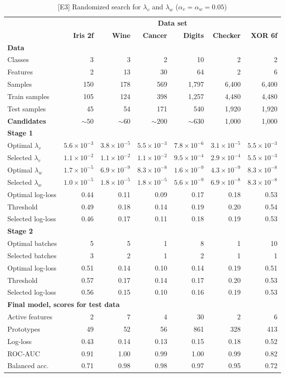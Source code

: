 %
\begin{table}
\caption{[E3] Randomized search for $\lambda_v$ and $\lambda_w$ ($\alpha_v=\alpha_w=0.05$)}
\label{tab_e3}
%
\begin{center}
\small
\begin{tabular}{|lrrrrrr|}
\hline
&\multicolumn{6}{c|}{\textbf{\hrulefill\ Data set \hrulefill}}\\
&\textbf{Iris 2f}&\textbf{Wine}&\textbf{Cancer}&\textbf{Digits}&\textbf{Checker}&\textbf{XOR 6f}\\
\multicolumn{7}{|l|}{\textbf{Data}}\\
Classes&3&3&2&10&2&2\\
Features&2&13&30&64&2&6\\
Samples&150&178&569&1,797&6,400&6,400\\
Train samples&105&124&398&1,257&4,480&4,480\\
Test samples&45&54&171&540&1,920&1,920\\
\textbf{Candidates}&$\sim50$&$\sim60$&$\sim200$&$\sim630$&1,000&1,000\\
\multicolumn{7}{|l|}{\textbf{Stage 1}}\\
Optimal $\lambda_v$&$5.6\times10^{-3}$&$3.8\times10^{-5}$&$5.5\times10^{-3}$&$7.8\times10^{-6}$&$3.1\times10^{-5}$&$5.5\times10^{-3}$\\
Selected $\lambda_v$&$1.1\times10^{-2}$&$1.1\times10^{-2}$&$1.1\times10^{-2}$&$9.5\times10^{-4}$&$2.9\times10^{-4}$&$5.5\times10^{-3}$\\
Optimal $\lambda_w$&$1.7\times10^{-5}$&$6.9\times10^{-9}$&$8.3\times10^{-8}$&$1.6\times10^{-9}$&$4.3\times10^{-9}$&$8.3\times10^{-8}$\\
Selected $\lambda_w$&$1.0\times10^{-5}$&$1.8\times10^{-5}$&$1.8\times10^{-5}$&$5.6\times10^{-9}$&$6.9\times10^{-8}$&$8.3\times10^{-8}$\\
Optimal log-loss&0.44&0.11&0.09&0.17&0.18&0.53\\
Threshold&0.49&0.18&0.14&0.19&0.20&0.54\\
Selected log-loss&0.46&0.17&0.11&0.18&0.19&0.53\\
\multicolumn{7}{|l|}{\textbf{Stage 2}}\\
Optimal batches&5&5&1&8&1&10\\
Selected batches&3&2&1&2&1&1\\
Optimal log-loss&0.51&0.14&0.10&0.14&0.19&0.51\\
Threshold&0.57&0.17&0.14&0.17&0.20&0.53\\
Selected log-loss&0.56&0.15&0.10&0.16&0.19&0.53\\
\multicolumn{7}{|l|}{\textbf{Final model, scores for test data}}\\
Active features&2&7&4&30&2&6\\
Prototypes&49&52&56&861&328&413\\
Log-loss&0.43&0.14&0.13&0.15&0.18&0.52\\
ROC-AUC&0.91&1.00&0.99&1.00&0.99&0.82\\
Balanced acc.&0.71&0.98&0.98&0.97&0.95&0.72\\
\hline
\end{tabular}
\end{center}
\end{table}
